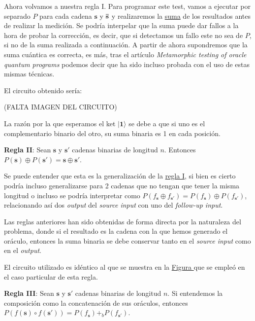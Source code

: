 Ahora volvamos a nuestra regla I. Para programar este test, vamos a ejecutar por separado $P$ para cada cadena $\mathbf{s}$ y $\mathbf{\Bar{s}}$ y realizaremos la \hyperref[Sec3.1:Suma]{suma} de los resultados antes de realizar la medición. Se podría interpelar que la suma puede dar fallos a la hora de probar la corrección, es decir, que si detectamos un fallo este no sea de $P$, si no de la suma realizada a continuación. A partir de ahora supondremos que la suma cuántica es correcta, es más, tras el artículo \textit{Metamorphic testing of oracle quantum programs}\cite{metamorphicAdd:2022} podemos decir que ha sido incluso probada con el uso de estas mismas técnicas. \newline

El circuito obtenido sería: \newline

 (FALTA IMAGEN DEL CIRCUITO)\newline

La razón por la que esperamos el ket $|\mathbf{1}\rangle$ se debe a que si uno es el complementario binario del otro, su suma binaria es 1 en cada posición.\newline

\textbf{Regla II}: Sean $\mathbf{s}$ y $\mathbf{s}'$ cadenas binarias de longitud $n$. Entonces $P(\mathbf{s})\oplus P(\mathbf{s}')=\mathbf{s} \oplus \mathbf{s}'$.\newline

 Se puede entender que esta es la generalización de la \hyperref[R:BV:1]{regla I}, si bien es cierto podría incluso generalizarse para 2 cadenas que no tengan que tener la misma longitud o incluso se podría interpretar como $P(f_{\mathbf{s}
}\oplus f_{\mathbf{s}'})=P(f_{\mathbf{s}})\oplus P(f_{\mathbf{s}'})$, relacionando así dos \textit{output} del \textit{source input} con uno del \textit{follow-up input}.\newline

 Las reglas anteriores han sido obtenidas de forma directa por la naturaleza del problema, donde si el resultado es la cadena con la que hemos generado el oráculo, entonces la suma binaria se debe conservar tanto en el \textit{source input} como en el \textit{output}.\newline

 El circuito utilizado es idéntico al que se muestra en la \hyperref[Fig:BVRule1]{Figura } que se empleó en el caso particular de esta regla. \newline

 \textbf{Regla III}: Sean $\mathbf{s}$ y $\mathbf{s}'$ cadenas binarias de longitud $n$. Si entendemos la composición como la concatenación de sus oráculos, entonces $P(f(\mathbf{s}) \circ f(\mathbf{s}'))= P(f_{\mathbf{s}}) +_{b} P(f_{\mathbf{s}'})$.\newline

